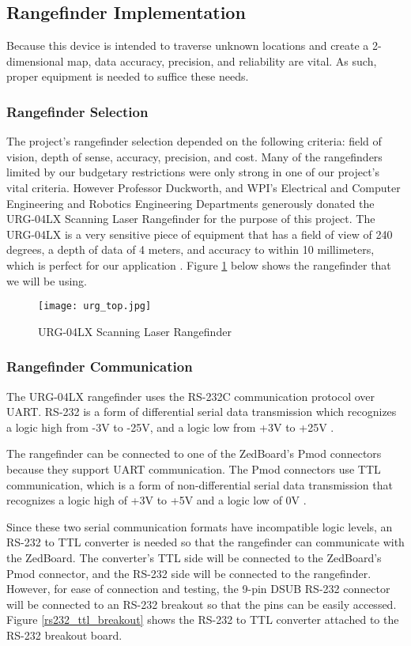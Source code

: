 \subsection{Rangefinder Implementation}
Because this device is intended to traverse unknown locations and create a 2-dimensional map, data accuracy, precision, and reliability are vital. As such, proper equipment is needed to suffice these needs. 

\subsubsection{Rangefinder Selection}
The project's rangefinder selection depended on the following criteria: field of vision, depth of sense, accuracy, precision, and cost. Many of the rangefinders limited by our budgetary restrictions were only strong in one of our project's vital criteria. However Professor Duckworth, and WPI's Electrical and Computer Engineering and Robotics Engineering Departments generously donated the URG-04LX Scanning Laser Rangefinder for the purpose of this project. The URG-04LX is a very sensitive piece of equipment that has a field of view of 240 degrees, a depth of data of 4 meters, and accuracy to within 10 millimeters, which is perfect for our application \cite{urg04lx_specifications}. Figure \ref{rangefinder_pic} below shows the rangefinder that we will be using.

\begin{figure}[H]
	\centerline{\texttt{[image: urg\_top.jpg]}}
	\caption{URG-04LX Scanning Laser Rangefinder}
	\label{rangefinder_pic}
\end{figure}

\subsubsection{Rangefinder Communication}
The URG-04LX rangefinder uses the RS-232C communication protocol over UART. RS-232 is a form of differential serial data transmission which recognizes a logic high from -3V to -25V, and a logic low from +3V to +25V \cite{rs232}.
\par
The rangefinder can be connected to one of the ZedBoard's Pmod connectors because they support UART communication. The Pmod connectors use TTL communication, which is a form of non-differential serial data transmission that recognizes a logic high of +3V to +5V and a logic low of 0V \cite{ttl}. 
\par
Since these two serial communication formats have incompatible logic levels, an RS-232 to TTL converter is needed so that the rangefinder can communicate with the ZedBoard. The converter's TTL side will be connected to the ZedBoard's Pmod connector, and the RS-232 side will be connected to the rangefinder. However, for ease of connection and testing, the 9-pin DSUB RS-232 connector will be connected to an RS-232 breakout so that the pins can be easily accessed. Figure \ref{rs232_ttl_breakout} shows the RS-232 to TTL converter attached to the RS-232 breakout board.

